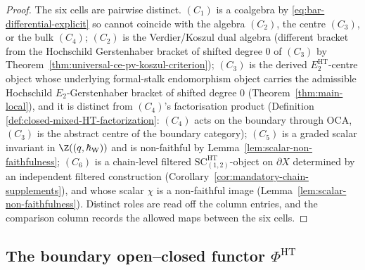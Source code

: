 \begin{proof}
The six cells are pairwise distinct.  \((C_1)\) is a coalgebra by
\eqref{eq:bar-differential-explicit} so cannot coincide with the
algebra \((C_2)\), the centre \((C_3)\), or the bulk \((C_4)\);
\((C_2)\) is the Verdier/Koszul dual algebra (different bracket from
the Hochschild Gerstenhaber bracket of shifted degree \(0\) of \((C_3)\) by
Theorem~\ref{thm:universal-ce-pv-koszul-criterion});
	\((C_3)\) is the derived \(E_2^{\mathrm{HT}}\)-centre object whose
	underlying formal-stalk endomorphism object carries the
	admissible Hochschild \(E_2\)-Gerstenhaber bracket of shifted degree \(0\)
	(Theorem~\ref{thm:main-local}),
and it is distinct from \((C_4)\)'s factorisation product (Definition
\ref{def:closed-mixed-HT-factorization}: \((C_4)\) acts on the
boundary through \(\mathrm{OCA}\), \((C_3)\) is the abstract centre
of the boundary category); \((C_5)\) is a graded scalar
invariant in \(\Z((q,\hbar_{\mathrm{W}}))\) and is non-faithful by
Lemma~\ref{lem:scalar-non-faithfulness}; \((C_6)\) is
a chain-level filtered \(\mathrm{SC}^{\mathrm{HT}}_{(1,2)}\)-object
on \(\partial X\) determined by an independent filtered construction
(Corollary~\ref{cor:mandatory-chain-supplements}), and whose scalar
\(\chi\) is a non-faithful image
(Lemma~\ref{lem:scalar-non-faithfulness}).  Distinct roles are read
off the column entries, and the comparison column records the allowed
maps between the six cells.
\end{proof}

\subsection{The boundary open--closed functor
\texorpdfstring{$\Phi^{\mathrm{HT}}$}{Phi-HT}}
\label{ssec:phi-ht-functor}

